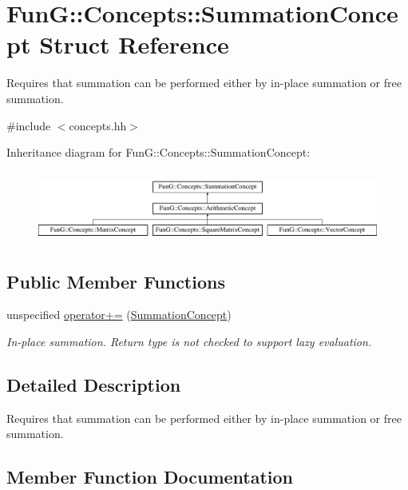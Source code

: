 \hypertarget{structFunG_1_1Concepts_1_1SummationConcept}{}\section{FunG\+:\+:Concepts\+:\+:Summation\+Concept Struct Reference}
\label{structFunG_1_1Concepts_1_1SummationConcept}


Requires that summation can be performed either by in-\/place summation or free summation.  




{\ttfamily \#include $<$concepts.\+hh$>$}

Inheritance diagram for FunG\+:\+:Concepts\+:\+:Summation\+Concept\+:\begin{figure}[H]
\begin{center}
\leavevmode
\includegraphics[height=2.352941cm]{structFunG_1_1Concepts_1_1SummationConcept}
\end{center}
\end{figure}
\subsection*{Public Member Functions}
\begin{DoxyCompactItemize}
\item 
unspecified \hyperlink{structFunG_1_1Concepts_1_1SummationConcept_aa8214ca88fddf74e3bc9e7dbfe2b606f}{operator+=} (\hyperlink{structFunG_1_1Concepts_1_1SummationConcept}{Summation\+Concept})
\begin{DoxyCompactList}\small\item\em In-\/place summation. Return type is not checked to support lazy evaluation. \end{DoxyCompactList}\end{DoxyCompactItemize}


\subsection{Detailed Description}
Requires that summation can be performed either by in-\/place summation or free summation. 

\subsection{Member Function Documentation}
